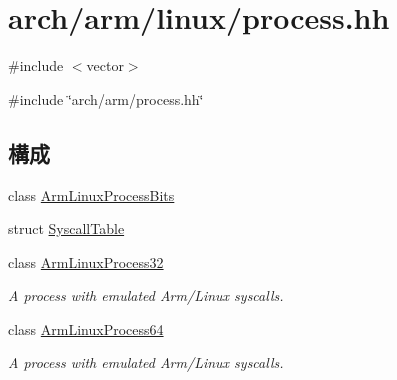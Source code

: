 \hypertarget{arch_2arm_2linux_2process_8hh}{
\section{arch/arm/linux/process.hh}
\label{arch_2arm_2linux_2process_8hh}
}
{\ttfamily \#include $<$vector$>$}\par
{\ttfamily \#include \char`\"{}arch/arm/process.hh\char`\"{}}\par
\subsection*{構成}
\begin{DoxyCompactItemize}
\item 
class \hyperlink{classArmLinuxProcessBits}{ArmLinuxProcessBits}
\item 
struct \hyperlink{structArmLinuxProcessBits_1_1SyscallTable}{SyscallTable}
\item 
class \hyperlink{classArmLinuxProcess32}{ArmLinuxProcess32}
\begin{DoxyCompactList}\small\item\em A process with emulated Arm/Linux syscalls. \item\end{DoxyCompactList}\item 
class \hyperlink{classArmLinuxProcess64}{ArmLinuxProcess64}
\begin{DoxyCompactList}\small\item\em A process with emulated Arm/Linux syscalls. \item\end{DoxyCompactList}\end{DoxyCompactItemize}
